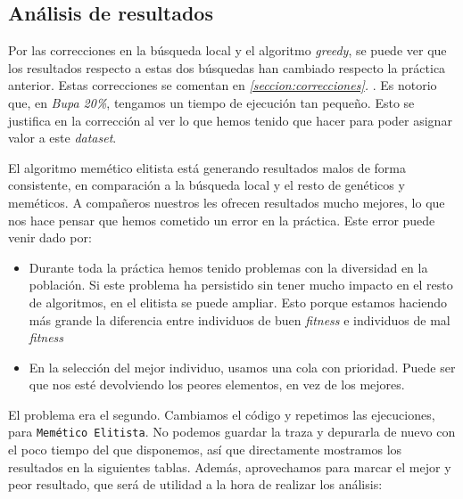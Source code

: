 \documentclass[11pt]{article}
\begin{document}
\subsection{Análisis de resultados}

Por las correcciones en la búsqueda local y el algoritmo \emph{greedy}, se puede ver que los resultados respecto a estas dos búsquedas han cambiado respecto la práctica anterior. Estas correcciones se comentan en \emph{\ref{seccion:correcciones}. }. Es notorio que, en \emph{Bupa 20\%}, tengamos un tiempo de ejecución tan pequeño. Esto se justifica en la corrección al ver lo que hemos tenido que hacer para poder asignar valor a este \emph{dataset}.

El algoritmo memético elitista está generando resultados malos de forma consistente, en comparación a la búsqueda local y el resto de genéticos y meméticos. A compañeros nuestros les ofrecen resultados mucho mejores, lo que nos hace pensar que hemos cometido un error en la práctica. Este error puede venir dado por:

\begin{itemize}
    \item Durante toda la práctica hemos tenido problemas con la diversidad en la población. Si este problema ha persistido sin tener mucho impacto en el resto de algoritmos, en el elitista se puede ampliar. Esto porque estamos haciendo más grande la diferencia entre individuos de buen \emph{fitness} e individuos de mal \emph{fitness}
    \item En la selección del mejor individuo, usamos una cola con prioridad. Puede ser que nos esté devolviendo los peores elementos, en vez de los mejores.
\end{itemize}

El problema era el segundo. Cambiamos el código y repetimos las ejecuciones, para \lstinline{Memético Elitista}. No podemos guardar la traza y depurarla de nuevo con el poco tiempo del que disponemos, así que directamente mostramos los resultados en la siguientes tablas. Además, aprovechamos para marcar el mejor y peor resultado, que será de utilidad a la hora de realizar los análisis:


\end{document}
